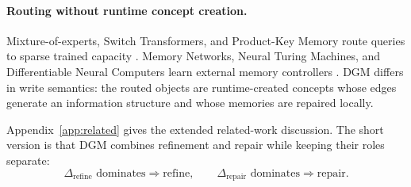 \paragraph{Routing without runtime concept creation.}
Mixture-of-experts, Switch Transformers, and Product-Key Memory route queries to sparse trained capacity \citep{shazeer2017outrageously,fedus2022switch,lample2019large}. Memory Networks, Neural Turing Machines, and Differentiable Neural Computers learn external memory controllers \citep{weston2015memory,sukhbaatar2015end,graves2014neural,graves2016hybrid}. DGM differs in write semantics: the routed objects are runtime-created concepts whose edges generate an information structure and whose memories are repaired locally.

Appendix~\ref{app:related} gives the extended related-work discussion. The short version is that DGM combines refinement and repair while keeping their roles separate:
\[
\Delta_{\mathrm{refine}}\text{ dominates}\Rightarrow\text{refine},
\qquad
\Delta_{\mathrm{repair}}\text{ dominates}\Rightarrow\text{repair}.
\]
